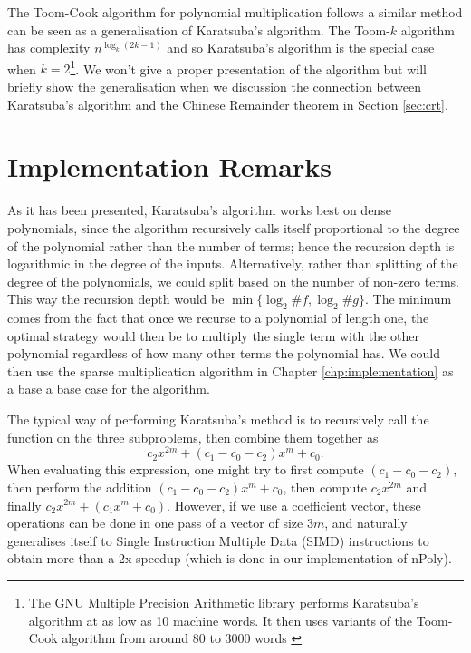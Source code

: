 The Toom-Cook algorithm for polynomial multiplication follows a similar method can be seen as a generalisation of Karatsuba's algorithm. The Toom-$k$ algorithm has complexity $n^{\log_k(2k - 1)}$ and so Karatsuba's algorithm is the special case when $k = 2$\footnote{The GNU Multiple Precision Arithmetic library performs Karatsuba's algorithm at as low as 10 machine words. It then uses variants of the Toom-Cook algorithm from around 80 to 3000 words \cite{gmp-big-num}}. We won't give a proper presentation of the algorithm but will briefly show the generalisation when we discussion the connection between Karatsuba's algorithm and the Chinese Remainder theorem in Section \ref{sec:crt}.

\medskip

\section{Implementation Remarks}

As it has been presented, Karatsuba's algorithm works best on dense polynomials, since the algorithm recursively calls itself proportional to the degree of the polynomial rather than the number of terms; hence the recursion depth is logarithmic in the degree of the inputs. Alternatively, rather than splitting of the degree of the polynomials, we could split based on the number of non-zero terms. This way the recursion depth would be $\min\{\log_2 \# f, \log_2 \# g\}$. The minimum comes from the fact that once we recurse to a polynomial of length one, the optimal strategy would then be to multiply the single term with the other polynomial regardless of how many other terms the polynomial has. We could then use the sparse multiplication algorithm in Chapter \ref{chp:implementation} as a base a base case for the algorithm.

The typical way of performing Karatsuba's method is to recursively call the function on the three subproblems, then combine them together as
\[
    c_2x^{2m} + (c_1 - c_0 - c_2) x^m + c_0.
\]
When evaluating this expression, one might try to first compute $(c_1 - c_0 - c_2)$, then perform the addition $(c_1 - c_0 - c_2)x^m + c_0$, then compute $c_2x^{2m}$ and finally $c_2x^{2m} + (c_1x^m + c_0)$. However, if we use a coefficient vector, these operations can be done in one pass of a vector of size $3m$, and naturally generalises itself to Single Instruction Multiple Data (SIMD) instructions to obtain more than a 2x speedup (which is done in our implementation of nPoly\cite{npoly}).


